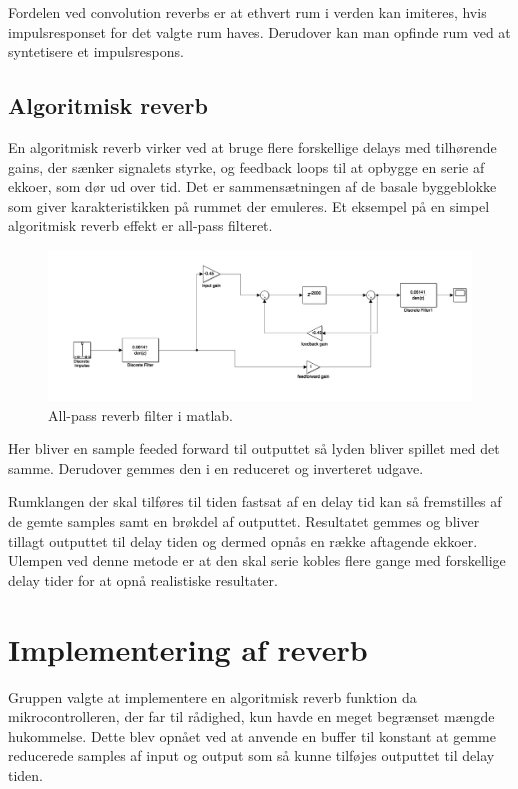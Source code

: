 Fordelen ved convolution reverbs er at ethvert rum i verden kan imiteres, hvis impulsresponset for det valgte rum haves.\newline
Derudover kan man opfinde rum ved at syntetisere et impulsrespons.

\subsection{Algoritmisk reverb}
En algoritmisk reverb virker ved at bruge flere forskellige delays med tilhørende gains, der sænker signalets styrke, og feedback loops til at opbygge en serie af ekkoer, som dør ud over tid.
Det er sammensætningen af de basale byggeblokke som giver karakteristikken på rummet der emuleres.\newline
Et eksempel på en simpel algoritmisk reverb effekt er all-pass filteret.
\begin{figure}[h]
\centering
\includegraphics[width=0.8\linewidth]{./billeder/reverb-testopsaetning.png}
\caption{All-pass reverb filter i matlab.}
\label{fig:allPassMatLab}
\end{figure}
Her bliver en sample feeded forward til outputtet så lyden bliver spillet med det samme.
Derudover gemmes den i en reduceret og inverteret udgave. %

Rumklangen der skal tilføres til tiden fastsat af en delay tid kan så fremstilles af de gemte samples samt en brøkdel af outputtet.
Resultatet gemmes og bliver tillagt outputtet til delay tiden og dermed opnås en række aftagende ekkoer.
Ulempen ved denne metode er at den skal serie kobles flere gange med forskellige delay tider for at opnå realistiske resultater.


\section{Implementering af reverb}
Gruppen valgte at implementere en algoritmisk reverb funktion da mikrocontrolleren, der far til rådighed, kun havde en meget begrænset mængde hukommelse.
Dette blev opnået ved at anvende en buffer til konstant at gemme reducerede samples af input og output som så kunne tilføjes outputtet til delay tiden.

